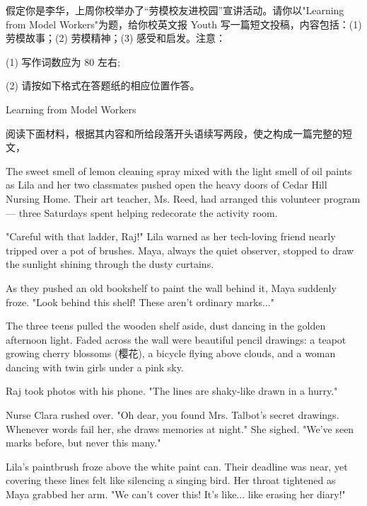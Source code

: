 \documentclass{英语试卷}
\begin{document}
\par 假定你是李华，上周你校举办了“劳模校友进校园”宣讲活动。请你以"Learning from Model Workers"为题，给你校英文报 Youth 写一篇短文投稿，内容包括：(1) 劳模故事；(2) 劳模精神；(3) 感受和启发。注意：\par
\par (1) 写作词数应为 80 左右;\par
\par (2) 请按如下格式在答题纸的相应位置作答。\par
\par Learning from Model Workers\par
{}
\par 阅读下面材料，根据其内容和所给段落开头语续写两段，使之构成一篇完整的短文，\par
\par The sweet smell of lemon cleaning spray mixed with the light smell of oil paints as Lila and her two classmates pushed open the heavy doors of Cedar Hill Nursing Home. Their art teacher, Ms. Reed, had arranged this volunteer program — three Saturdays spent helping redecorate the activity room.\par
\par "Careful with that ladder, Raj!" Lila warned as her tech-loving friend nearly tripped over a pot of brushes. Maya, always the quiet observer, stopped to draw the sunlight shining through the dusty curtains.\par
\par As they pushed an old bookshelf to paint the wall behind it, Maya suddenly froze. "Look behind this shelf! These aren't ordinary marks..."\par
\par The three teens pulled the wooden shelf aside, dust dancing in the golden afternoon light. Faded across the wall were beautiful pencil drawings: a teapot growing cherry blossoms (樱花), a bicycle flying above clouds, and a woman dancing with twin girls under a pink sky.\par
\par Raj took photos with his phone. "The lines are shaky-like drawn in a hurry."\par
\par Nurse Clara rushed over. "Oh dear, you found Mrs. Talbot's secret drawings. Whenever words fail her, she draws memories at night." She sighed. "We've seen marks before, but never this many."\par
\par Lila's paintbrush froze above the white paint can. Their deadline was near, yet covering these lines felt like silencing a singing bird. Her throat tightened as Maya grabbed her arm. "We can't cover this! It's like... like erasing her diary!"\par
\end{document}
